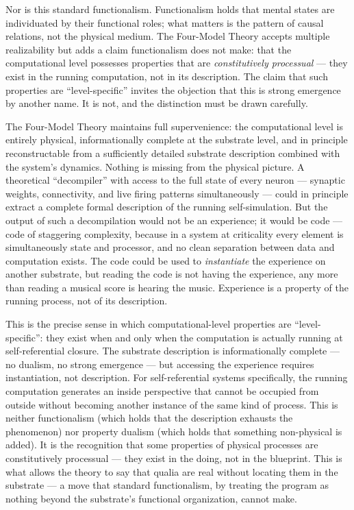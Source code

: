 \documentclass[12pt]{article}
\begin{document}
Nor is this standard functionalism. Functionalism holds that mental states are individuated by their functional roles; what matters is the pattern of causal relations, not the physical medium. The Four-Model Theory accepts multiple realizability but adds a claim functionalism does not make: that the computational level possesses properties that are \emph{constitutively processual} --- they exist in the running computation, not in its description. The claim that such properties are ``level-specific'' invites the objection that this is strong emergence by another name. It is not, and the distinction must be drawn carefully.

The Four-Model Theory maintains full supervenience: the computational level is entirely physical, informationally complete at the substrate level, and in principle reconstructable from a sufficiently detailed substrate description combined with the system's dynamics. Nothing is missing from the physical picture. A theoretical ``decompiler'' with access to the full state of every neuron --- synaptic weights, connectivity, and live firing patterns simultaneously --- could in principle extract a complete formal description of the running self-simulation. But the output of such a decompilation would not be an experience; it would be code --- code of staggering complexity, because in a system at criticality every element is simultaneously state and processor, and no clean separation between data and computation exists. The code could be used to \emph{instantiate} the experience on another substrate, but reading the code is not having the experience, any more than reading a musical score is hearing the music. Experience is a property of the running process, not of its description.

This is the precise sense in which computational-level properties are ``level-specific'': they exist when and only when the computation is actually running at self-referential closure. The substrate description is informationally complete --- no dualism, no strong emergence --- but accessing the experience requires instantiation, not description. For self-referential systems specifically, the running computation generates an inside perspective that cannot be occupied from outside without becoming another instance of the same kind of process. This is neither functionalism (which holds that the description exhausts the phenomenon) nor property dualism (which holds that something non-physical is added). It is the recognition that some properties of physical processes are constitutively processual --- they exist in the doing, not in the blueprint. This is what allows the theory to say that qualia are real without locating them in the substrate --- a move that standard functionalism, by treating the program as nothing beyond the substrate's functional organization, cannot make.
\end{document}

